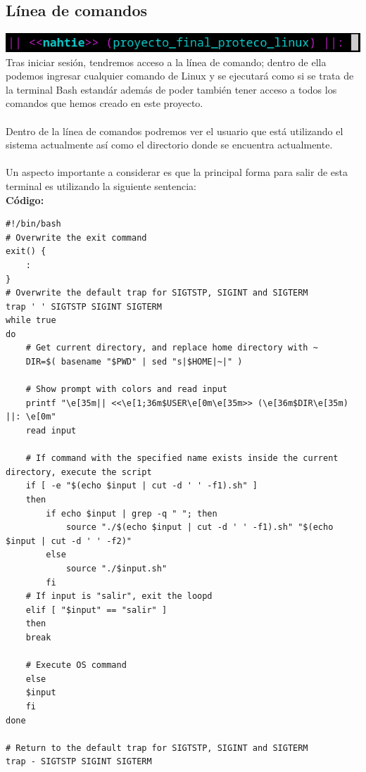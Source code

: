\documentclass[12pt,a4paper]{article}
\begin{document}
\subsection{Línea de comandos}
    \centering
    \includegraphics[width=14cm]{img/linea-comando.png} \\
    \justifying
    \noindent
    Tras iniciar sesión, tendremos acceso a la línea de comando; dentro de ella podemos ingresar cualquier comando de Linux y se ejecutará como si se trata de la terminal Bash estandár además de poder también tener acceso a todos los comandos que hemos creado en este proyecto.
    \\\\
    Dentro de la línea de comandos podremos ver el usuario que está utilizando el sistema actualmente así como el directorio donde se encuentra actualmente.
    \\\\
    Un aspecto importante a considerar es que la principal forma para salir de esta terminal es utilizando la siguiente sentencia:
    \\
    \textbf{Código:}
    \begin{lstlisting}[style=BashInputStyle]
#!/bin/bash
# Overwrite the exit command
exit() {
    :
}
# Overwrite the default trap for SIGTSTP, SIGINT and SIGTERM
trap ' ' SIGTSTP SIGINT SIGTERM
while true
do
    # Get current directory, and replace home directory with ~
    DIR=$( basename "$PWD" | sed "s|$HOME|~|" )
    
    # Show prompt with colors and read input
    printf "\e[35m|| <<\e[1;36m$USER\e[0m\e[35m>> (\e[36m$DIR\e[35m) ||: \e[0m"
    read input
    
    # If command with the specified name exists inside the current directory, execute the script
    if [ -e "$(echo $input | cut -d ' ' -f1).sh" ]
    then
        if echo $input | grep -q " "; then
            source "./$(echo $input | cut -d ' ' -f1).sh" "$(echo $input | cut -d ' ' -f2)"
        else
	        source "./$input.sh"
        fi    
    # If input is "salir", exit the loopd
    elif [ "$input" == "salir" ]
    then
	break

    # Execute OS command
    else
	$input
    fi
done

# Return to the default trap for SIGTSTP, SIGINT and SIGTERM
trap - SIGTSTP SIGINT SIGTERM
    \end{lstlisting} 
\end{document}
